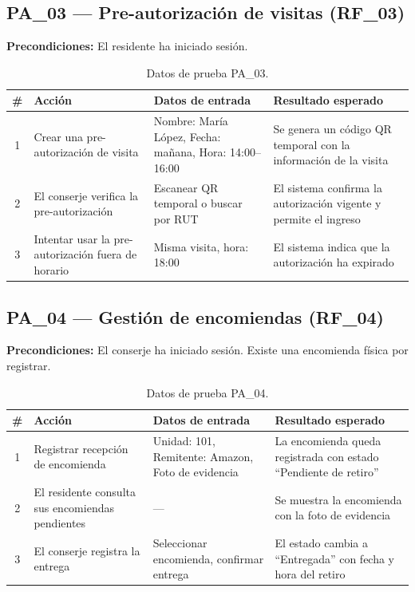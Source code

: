\subsection{PA\_03 — Pre-autorización de visitas (RF\_03)}

\textbf{Precondiciones:} El residente ha iniciado sesión.

\begin{table}[H]
\centering
\small
\begin{tabular}{|c|p{}|p{}|p{}|}
\hline
\textbf{\#} & \textbf{Acción} & \textbf{Datos de entrada} & \textbf{Resultado esperado} \\ \hline
1 & Crear una pre-autorización de visita & Nombre: María López, Fecha: mañana, Hora: 14:00--16:00 & Se genera un código QR temporal con la información de la visita \\ \hline
2 & El conserje verifica la pre-autorización & Escanear QR temporal o buscar por RUT & El sistema confirma la autorización vigente y permite el ingreso \\ \hline
3 & Intentar usar la pre-autorización fuera de horario & Misma visita, hora: 18:00 & El sistema indica que la autorización ha expirado \\ \hline
\end{tabular}
\caption{Datos de prueba PA\_03.}
\end{table}

\subsection{PA\_04 — Gestión de encomiendas (RF\_04)}

\textbf{Precondiciones:} El conserje ha iniciado sesión. Existe una encomienda física por registrar.

\begin{table}[H]
\centering
\small
\begin{tabular}{|c|p{}|p{}|p{}|}
\hline
\textbf{\#} & \textbf{Acción} & \textbf{Datos de entrada} & \textbf{Resultado esperado} \\ \hline
1 & Registrar recepción de encomienda & Unidad: 101, Remitente: Amazon, Foto de evidencia & La encomienda queda registrada con estado ``Pendiente de retiro'' \\ \hline
2 & El residente consulta sus encomiendas pendientes & --- & Se muestra la encomienda con la foto de evidencia \\ \hline
3 & El conserje registra la entrega & Seleccionar encomienda, confirmar entrega & El estado cambia a ``Entregada'' con fecha y hora del retiro \\ \hline
\end{tabular}
\caption{Datos de prueba PA\_04.}
\end{table}

